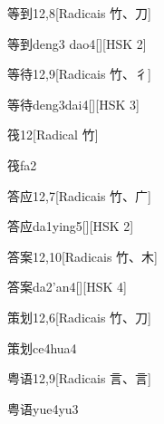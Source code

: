 \begin{entry}{等到}{12,8}[Radicais ⽵、⼑]
  \begin{phonetics}{等到}{deng3 dao4}[][HSK 2]
  \end{phonetics}
\end{entry}

\begin{entry}{等待}{12,9}[Radicais ⽵、⼻]
  \begin{phonetics}{等待}{deng3dai4}[][HSK 3]
  \end{phonetics}
\end{entry}

\begin{entry}{筏}{12}[Radical ⽵]
  \begin{phonetics}{筏}{fa2}
  \end{phonetics}
\end{entry}

\begin{entry}{答应}{12,7}[Radicais ⽵、⼴]
  \begin{phonetics}{答应}{da1ying5}[][HSK 2]
  \end{phonetics}
\end{entry}

\begin{entry}{答案}{12,10}[Radicais ⽵、⽊]
  \begin{phonetics}{答案}{da2'an4}[][HSK 4]
  \end{phonetics}
\end{entry}

\begin{entry}{策划}{12,6}[Radicais ⽵、⼑]
  \begin{phonetics}{策划}{ce4hua4}
  \end{phonetics}
\end{entry}

\begin{entry}{粤语}{12,9}[Radicais ⾔、⾔]
  \begin{phonetics}{粤语}{yue4yu3}
  \end{phonetics}
\end{entry}

